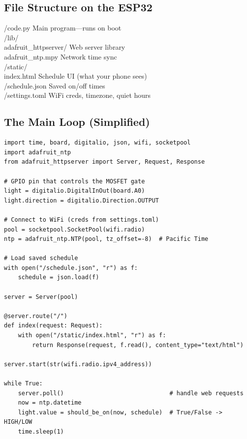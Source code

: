 \documentclass[10pt, letterpaper]{article}
\begin{document}
\vspace{-2pt}

\subsection{File Structure on the ESP32}

\begin{codebox}
\ttfamily\small
/code.py\hfill\textrm{\scriptsize\color{textgray} Main program---runs on boot}\\
/lib/\\
\quad adafruit\_httpserver/\hfill\textrm{\scriptsize\color{textgray} Web server library}\\
\quad adafruit\_ntp.mpy\hfill\textrm{\scriptsize\color{textgray} Network time sync}\\
/static/\\
\quad index.html\hfill\textrm{\scriptsize\color{textgray} Schedule UI (what your phone sees)}\\
/schedule.json\hfill\textrm{\scriptsize\color{textgray} Saved on/off times}\\
/settings.toml\hfill\textrm{\scriptsize\color{textgray} WiFi creds, timezone, quiet hours}
\end{codebox}

\vspace{-2pt}

\subsection{The Main Loop (Simplified)}

\begin{lstlisting}[style=circuitpy]
import time, board, digitalio, json, wifi, socketpool
import adafruit_ntp
from adafruit_httpserver import Server, Request, Response

# GPIO pin that controls the MOSFET gate
light = digitalio.DigitalInOut(board.A0)
light.direction = digitalio.Direction.OUTPUT

# Connect to WiFi (creds from settings.toml)
pool = socketpool.SocketPool(wifi.radio)
ntp = adafruit_ntp.NTP(pool, tz_offset=-8)  # Pacific Time

# Load saved schedule
with open("/schedule.json", "r") as f:
    schedule = json.load(f)

server = Server(pool)

@server.route("/")
def index(request: Request):
    with open("/static/index.html", "r") as f:
        return Response(request, f.read(), content_type="text/html")

server.start(str(wifi.radio.ipv4_address))

while True:
    server.poll()                              # handle web requests
    now = ntp.datetime
    light.value = should_be_on(now, schedule)  # True/False -> HIGH/LOW
    time.sleep(1)
\end{lstlisting}
\end{document}
